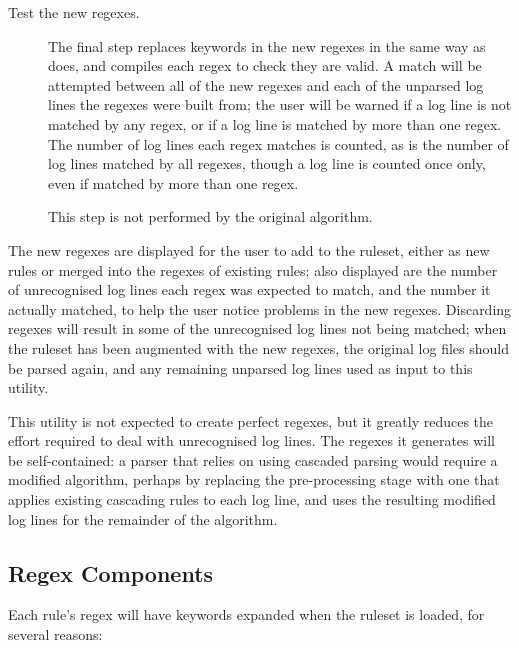 \begin{description}
    \item [Test the new regexes.]  The final step replaces keywords in the
        new regexes in the same way as \parsername{} does, and compiles
        each regex to check they are valid.  A match will be attempted
        between all of the new regexes and each of the unparsed log lines
        the regexes were built from; the user will be warned if a log line
        is not matched by any regex, or if a log line is matched by more
        than one regex.  The number of log lines each regex matches is
        counted, as is the number of log lines matched by all regexes,
        though a log line is counted once only, even if matched by more
        than one regex.

        This step is not performed by the original algorithm.

\end{description}

The new regexes are displayed for the user to add to the ruleset, either as
new rules or merged into the regexes of existing rules; also displayed are
the number of unrecognised log lines each regex was expected to match, and
the number it actually matched, to help the user notice problems in the new
regexes.  Discarding regexes will result in some of the unrecognised log
lines not being matched; when the ruleset has been augmented with the new
regexes, the original log files should be parsed again, and any remaining
unparsed log lines used as input to this utility.

This utility is not expected to create perfect regexes, but it greatly
reduces the effort required to deal with unrecognised log lines.  The
regexes it generates will be self-contained: a parser that relies on using
cascaded parsing would require a modified algorithm, perhaps by replacing
the pre-processing stage with one that applies existing cascading rules to
each log line, and uses the resulting modified log lines for the remainder
of the algorithm.

\subsection{Regex Components}

\label{regex components}

Each rule's regex will have keywords expanded when the ruleset is loaded,
for several reasons:

